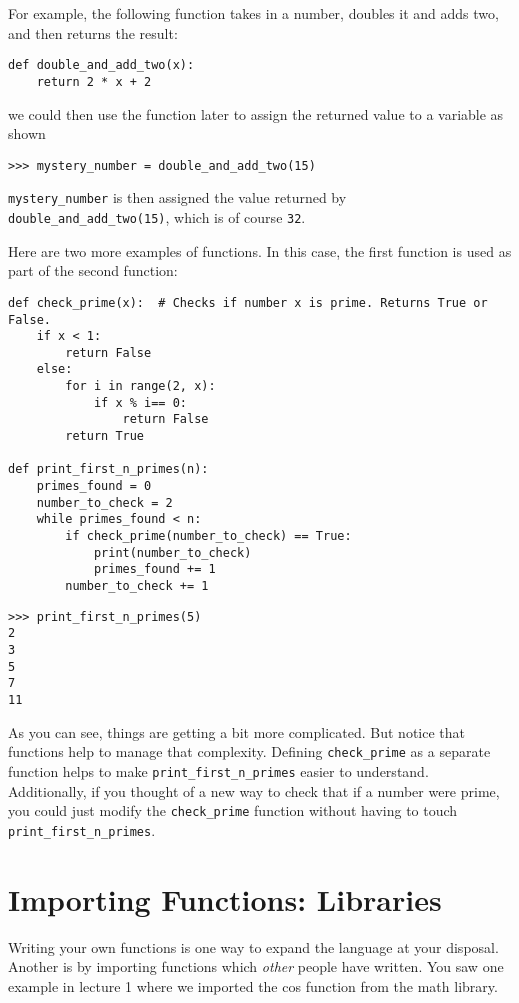 For example, the following function takes in a number, doubles it and adds two, and then returns the result:

\begin{lstlisting}
def double_and_add_two(x):
	return 2 * x + 2
\end{lstlisting}

we could then use the function later to assign the returned value to a variable as shown

\begin{lstlisting}[numbers=none]
>>> mystery_number = double_and_add_two(15)
\end{lstlisting}

\texttt{mystery\_number} is then assigned the value returned by \texttt{double\_and\_add\_two(15)}, which is of course \texttt{32}.

Here are two more examples of functions. In this case, the first function is used as part of the second function:

\begin{lstlisting}
def check_prime(x):  # Checks if number x is prime. Returns True or False.
	if x < 1:
		return False
	else:
		for i in range(2, x):
			if x % i== 0:
				return False
		return True

def print_first_n_primes(n):
	primes_found = 0
	number_to_check = 2
	while primes_found < n:
		if check_prime(number_to_check) == True:
			print(number_to_check)
			primes_found += 1
		number_to_check += 1
\end{lstlisting}

\begin{lstlisting}[numbers=none]
>>> print_first_n_primes(5)
2
3
5
7
11
\end{lstlisting}

As you can see, things are getting a bit more complicated. But notice that functions help to manage that complexity. Defining \texttt{check\_prime} as a separate function helps to make \texttt{print\_first\_n\_primes} easier to understand. Additionally, if you thought of a new way to check that if a number were prime, you could just modify the \texttt{check\_prime} function without having to touch \texttt{print\_first\_n\_primes}.


\section*{Importing Functions: Libraries}

Writing your own functions is one way to expand the language at your disposal. Another is by importing functions which \emph{other} people have written. You saw one example in lecture 1 where we imported the cos function from the math library.

